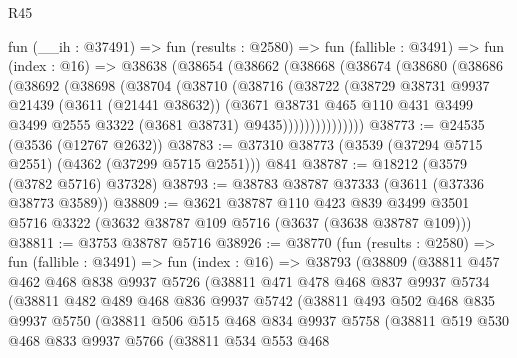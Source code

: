 \begin{lexlean}{R45}
\begin{coremodule}
    fun (__ih : @37491) =>
    fun (results : @2580) =>
    fun (fallible : @3491) =>
    fun (index : @16) =>
    @38638
      (@38654
        (@38662
          (@38668
            (@38674
              (@38680
                (@38686
                  (@38692
                    (@38698
                      (@38704
                        (@38710
                          (@38716
                            (@38722
                              (@38729
                                @38731
                                @9937
                                @21439
                                (@3611 (@21441 @38632))
                                (@3671
                                  @38731
                                  @465
                                  @110
                                  @431
                                  @3499
                                  @3499
                                  @2555
                                  @3322
                                  (@3681 @38731)
                                  @9435)))))))))))))))
@38773 := @24535 (@3536 (@12767 @2632))
@38783 := @37310 @38773 (@3539 (@37294 @5715 @2551) (@4362 (@37299 @5715 @2551))) @841
@38787 := @18212 (@3579 (@3782 @5716) @37328)
@38793 := @38783 @38787 @37333 (@3611 (@37336 @38773 @3589))
@38809 := @3621
    @38787
    @110
    @423
    @839
    @3499
    @3501
    @5716
    @3322
    (@3632 @38787 @109 @5716 (@3637 (@3638 @38787 @109)))
@38811 := @3753 @38787 @5716
@38926 := @38770
    (fun (results : @2580) =>
    fun (fallible : @3491) =>
    fun (index : @16) =>
    @38793
      (@38809
        (@38811
          @457
          @462
          @468
          @838
          @9937
          @5726
          (@38811
            @471
            @478
            @468
            @837
            @9937
            @5734
            (@38811
              @482
              @489
              @468
              @836
              @9937
              @5742
              (@38811
                @493
                @502
                @468
                @835
                @9937
                @5750
                (@38811
                  @506
                  @515
                  @468
                  @834
                  @9937
                  @5758
                  (@38811
                    @519
                    @530
                    @468
                    @833
                    @9937
                    @5766
                    (@38811
                      @534
                      @553
                      @468

\end{coremodule}
\end{lexlean}

